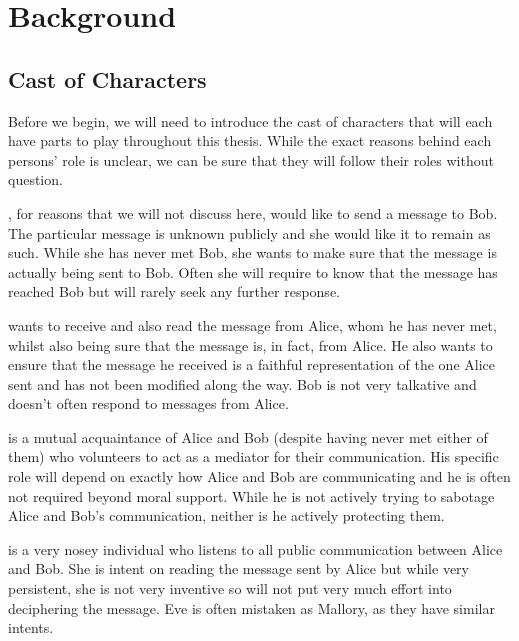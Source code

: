%
%
\graphicspath{{./chapters/chapter02/fig02/}}

\let\textcircled=\pgftextcircled
\chapter{Background}
\label{chap:background}

\section{Cast of Characters}

Before we begin, we will need to introduce the cast of characters that will each have parts to play throughout this thesis. While the exact reasons behind each persons' role is unclear, we can be sure that they will follow their roles without question. 

, for reasons that we will not discuss here, would like to send a message to Bob. The particular message is unknown publicly and she would like it to remain as such. While she has never met Bob, she wants to make sure that the message is actually being sent to Bob. Often she will require to know that the message has reached Bob but will rarely seek any further response.

 wants to receive and also read the message from Alice, whom he has never met, whilst also being sure that the message is, in fact, from Alice. He also wants to ensure that the message he received is a faithful representation of the one Alice sent and has not been modified along the way. Bob is not very talkative and doesn't often respond to messages from Alice.

 is a mutual acquaintance of Alice and Bob (despite having never met either of them) who volunteers to act as a mediator for their communication. His specific role will depend on exactly how Alice and Bob are communicating and he is often not required beyond moral support. While he is not actively trying to sabotage Alice and Bob's communication, neither is he actively protecting them.

 is a very nosey individual who listens to all public communication between Alice and Bob. She is intent on reading the message sent by Alice but while very persistent, she is not very inventive so will not put very much effort into deciphering the message. Eve is often mistaken as Mallory, as they have similar intents.

